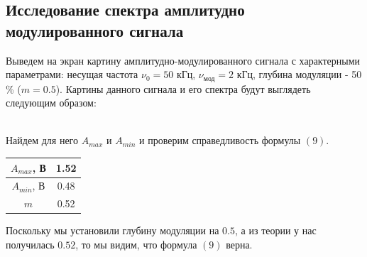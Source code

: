 \documentclass[a4paper,12pt]{article}
\begin{document}
\subsection*{Исследование спектра амплитудно модулированного сигнала}
Выведем на экран картину амплитудно-модулированного сигнала с характерными параметрами: несущая частота $\nu_0 = 50$ кГц, $\nu_{\text{мод}} = 2$ кГц, глубина модуляции - 50 \% ($m = 0.5$). Картины данного сигнала и его спектра будут выглядеть следующим образом:
\begin{figure}[h]
\centering
\end{figure}\\
Найдем для него $A_{max}$ и $A_{min}$ и проверим справедливость формулы $(9)$.
\begin{center}
\begin{tabular}{|c|c|}
\hline
$A_{max}$, В & 1.52 \\ \hline
$A_{min}$, В & 0.48 \\ \hline
$m$ & 0.52 \\ \hline
\end{tabular}
\end{center}
Поскольку мы установили глубину модуляции на $0.5$, а из теории у нас получилась $0.52$, то мы видим, что формула $(9)$ верна.
\end{document}
